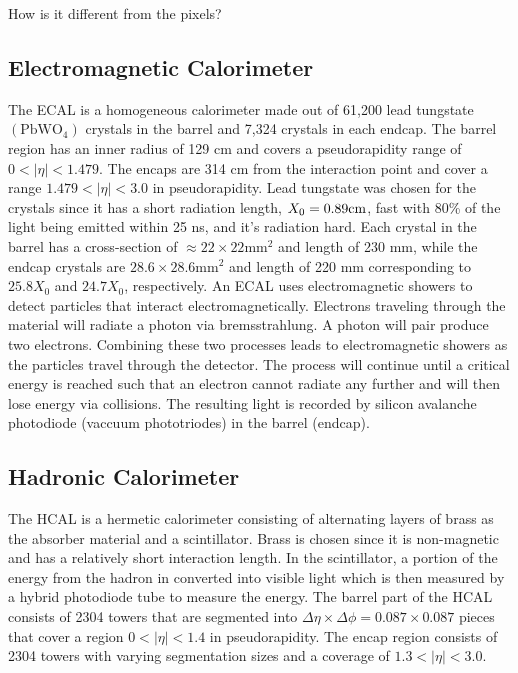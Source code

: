 How is it different from the pixels?

\subsection{Electromagnetic Calorimeter}
\label{sec:ECAL}

The ECAL is a homogeneous calorimeter made out of 61,200 lead tungstate $(\text{PbWO}_4)$ crystals in the barrel and 7,324 crystals in each endcap. The barrel region has an inner radius of 129 cm and covers a pseudorapidity range of $0<|\eta|<1.479$. The encaps are 314 cm from the interaction point and cover a range $1.479<|\eta|<3.0$ in pseudorapidity. Lead tungstate was chosen for the crystals since it has a short radiation length, $X_0=0.89 \text{cm}$, fast with 80\% of the light being emitted within 25 ns, and it's radiation hard. Each crystal in the barrel has a cross-section of $\approx22\times22 \text{mm}^2$ and length of 230 mm, while the endcap crystals are $28.6\times28.6 \text{mm}^2$ and length of 220 mm corresponding to $25.8X_0$ and $24.7X_0$, respectively. An ECAL uses electromagnetic showers to detect particles that interact electromagnetically. Electrons traveling through the material will radiate a photon via bremsstrahlung. A photon will pair produce two electrons. Combining these two processes leads to electromagnetic showers as the particles travel through the detector. The process will continue until a critical energy is reached such that an electron cannot radiate any further and will then lose energy via collisions. The resulting light is recorded by silicon avalanche photodiode (vaccuum phototriodes) in the barrel (endcap). 

\subsection{Hadronic Calorimeter}
\label{sec:HCAL}

The HCAL is a hermetic calorimeter consisting of alternating layers of brass as the absorber material and a scintillator. Brass is chosen since it is non-magnetic and has a relatively short interaction length. In the scintillator, a portion of the energy from the hadron in converted into visible light which is then measured by a hybrid photodiode tube to measure the energy. The barrel part of the HCAL consists of 2304 towers that are segmented into $\Delta\eta\times\Delta\phi=0.087\times0.087$ pieces that cover a region $0<|\eta|<1.4$ in pseudorapidity. The encap region consists of 2304 towers with varying segmentation sizes and a coverage of $1.3<|\eta|<3.0$. 

